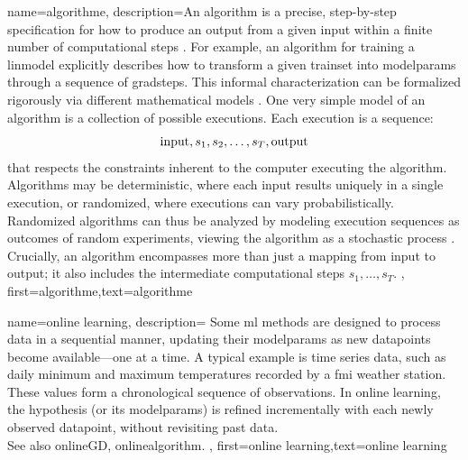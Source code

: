 {name={algorithme},
  description={An algorithm is a precise, step-by-step specification for 
  	how to produce an output from a given input within a finite number of computational steps \cite{Cormen:2022aa}. 
    For example, an algorithm for training a \gls{linmodel} explicitly describes how to 
	transform a given \gls{trainset} into \gls{modelparams} through a sequence of \gls{gradstep}s. 
    This informal characterization can be formalized rigorously via different mathematical \gls{model}s \cite{Sipser2013}. 
    One very simple \gls{model} of an algorithm is a collection of possible executions. Each execution is a sequence:
    $${\rm input},s_1,s_2,\ldots,s_T,{\rm output}$$ 
    that respects the constraints inherent to the computer executing the algorithm.
	Algorithms may be deterministic, where each input results uniquely in a single execution,
	or randomized, where executions can vary probabilistically. Randomized algorithms 
	can thus be analyzed by modeling execution sequences as outcomes of random experiments, 
	viewing the algorithm as a stochastic process \cite{RandomizedAlgos,BertsekasProb,Gallager13}.
	Crucially, an algorithm encompasses more than just a mapping from input to output; it also includes 
	the intermediate computational steps $s_1,\ldots,s_T$. 
	},
	first={algorithme},text={algorithme} 
}

{name={online learning},
	description={
		Some \gls{ml} methods  are designed to process \gls{data} in a sequential 
		manner, updating their \gls{modelparams} as new \gls{datapoint}s become available—one at a time. 
		A typical example is time series data, such as daily minimum and maximum temperatures 
		recorded by a \gls{fmi} weather station. These values form a chronological sequence 
		of observations. In online learning, the \gls{hypothesis} (or its \gls{modelparams}) is refined 
		incrementally with each newly observed \gls{datapoint}, without revisiting past \gls{data}.  \\ 
		See also \gls{onlineGD}, \gls{onlinealgorithm}. 
	},
	first={online learning},text={online learning} 
}

